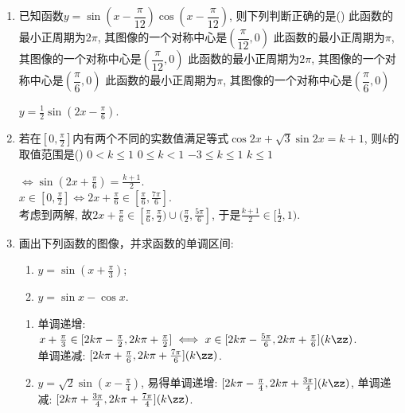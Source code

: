 \begin{enumerate}
\item 已知函数$y=\sin\left(x-\dfrac{\pi}{12}\right)\cos\left(x-\dfrac{\pi}{12}\right)$, 则下列判断正确的是\dotfill()
\xx
{此函数的最小正周期为$2\pi$, 其图像的一个对称中心是$\left(\dfrac{\pi}{12},0\right)$}
{此函数的最小正周期为$\pi$, 其图像的一个对称中心是$\left(\dfrac{\pi}{12},0\right)$}
{此函数的最小正周期为$2\pi$, 其图像的一个对称中心是$\left(\dfrac{\pi}{6},0\right)$}
{此函数的最小正周期为$\pi$, 其图像的一个对称中心是$\left(\dfrac{\pi}{6},0\right)$}
\begin{jieda}
$y=\frac{1}{2}\sin(2x-\frac{\pi}{6})$. 
\end{jieda}
\item 若在$\left[0,\frac{\pi}{2}\right]$内有两个不同的实数值满足等式$\cos2x+\sqrt{3}\sin2x=k+1$, 则$k$的取值范围是\dotfill()
\xx
{$0<k\leq 1$}
{$0\leq k<1$}
{$-3\leq k\leq 1$}
{$k\leq 1$}
\begin{jieda}
$\iff \sin(2x+\frac{\pi}{6})=\frac{k+1}{2}$. \\
$x\in[0,\frac{\pi}{2}]\iff 2x+\frac{\pi}{6}\in[\frac{\pi}{6},\frac{7\pi}{6}]$. \\
考虑到两解, 故$2x+\frac{\pi}{6}\in[\frac{\pi}{6},\frac{\pi}{2})\cup(\frac{\pi}{2},\frac{5\pi}{6}]$, 于是$\frac{k+1}{2}\in[\frac{1}{2},1)$. 
\end{jieda}
\item 画出下列函数的图像，并求函数的单调区间: 
\begin{enumerate}[(1)]
\item $y=\sin(x+\tfrac{\pi}{3})$;
\item $y=\sin{x}-\cos{x}$. 
\end{enumerate}
\begin{jieda}
\begin{enumerate}[(1)]
\item 单调递增: $x+\frac{\pi}{3}\in[2k\pi-\frac{\pi}{2},2k\pi+\frac{\pi}{2}]\iff x\in[2k\pi-\frac{5\pi}{6},2k\pi+\frac{\pi}{6}](k\zz)$. \\
单调递减: $[2k\pi+\frac{\pi}{6},2k\pi+\frac{7\pi}{6}](k\zz)$. 
\item $y=\sqrt{2}\sin(x-\frac{\pi}{4})$, 易得单调递增: $[2k\pi-\frac{\pi}{4},2k\pi+\frac{3\pi}{4}](k\zz)$, 单调递减: $[2k\pi+\frac{3\pi}{4},2k\pi+\frac{7\pi}{4}](k\zz)$. 
\end{enumerate}
\end{jieda}


\end{enumerate}
